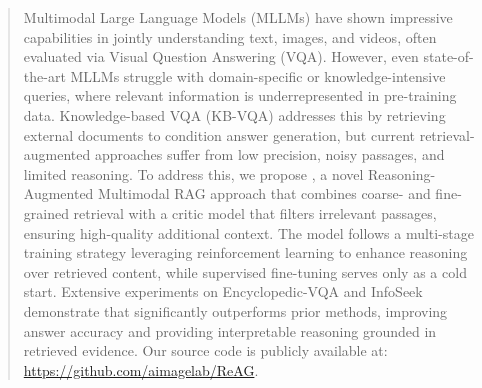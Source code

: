 \begin{abstract}
Multimodal Large Language Models (MLLMs) have shown impressive capabilities in jointly understanding text, images, and videos, often evaluated via Visual Question Answering (VQA). However, even state-of-the-art MLLMs struggle with domain-specific or knowledge-intensive queries, where relevant information is underrepresented in pre-training data. Knowledge-based VQA (KB-VQA) addresses this by retrieving external documents to condition answer generation, but current retrieval-augmented approaches suffer from low precision, noisy passages, and limited reasoning.
To address this, we propose \textbf{\ours}, a novel Reasoning-Augmented Multimodal RAG approach that combines coarse- and fine-grained retrieval with a critic model that filters irrelevant passages, ensuring high-quality additional context. The model follows a multi-stage training strategy leveraging reinforcement learning to enhance reasoning over retrieved content, while supervised fine-tuning serves only as a cold start. Extensive experiments on Encyclopedic-VQA and InfoSeek demonstrate that \ours significantly outperforms prior methods, improving answer accuracy and providing interpretable reasoning grounded in retrieved evidence.  Our source code is publicly available at: 
{\small{\url{https://github.com/aimagelab/ReAG}}}.
\end{abstract}
